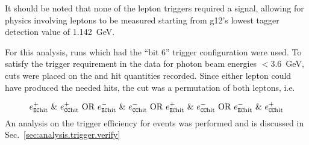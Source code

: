 It should be noted that none of the lepton triggers required a  signal, allowing for physics involving leptons to be measured starting from g12's lowest tagger detection value of 1.142~GeV.

For this analysis, runs which had the ``bit 6'' trigger configuration were used. To satisfy the trigger requirement in the data for photon beam energies $<3.6$~GeV, cuts were placed on the  and  hit quantities recorded. Since either lepton could have produced the needed hits, the cut was a permutation of both leptons, i.e.

	\begin{equation}
e^+_\mathrm{\abbr{EC}hit} \ \& \ e^+_\mathrm{\abbr{CC}hit} \  \mathrm{OR} \ e^-_\mathrm{\abbr{EC}hit} \ \& \ e^-_\mathrm{\abbr{CC}hit} \ \mathrm{OR} \ e^+_\mathrm{\abbr{EC}hit} \ \& \ e^-_\mathrm{\abbr{CC}hit} \ \mathrm{OR} \ e^-_\mathrm{\abbr{EC}hit} \ \& \ e^+_\mathrm{\abbr{CC}hit} \label{eq:ECCC}
	\end{equation}
	An analysis on the trigger efficiency for \pizT events was performed and is discussed in Sec.~\ref{sec:analysis.trigger.verify}
\FloatBarrier
\FloatBarrier
\FloatBarrier
